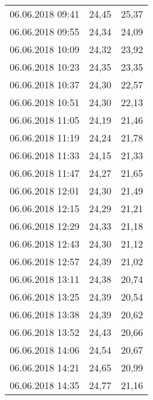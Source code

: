 \documentclass[a4paper,11pt,twoside]{article}
\begin{document}
\begin{longtable}[c]{ccc}
06.06.2018 09:41       & 24,45                & 25,37                          \\
06.06.2018 09:55       & 24,34                & 24,09                          \\
06.06.2018 10:09       & 24,32                & 23,92                          \\
06.06.2018 10:23       & 24,35                & 23,35                          \\
06.06.2018 10:37       & 24,30                & 22,57                          \\
06.06.2018 10:51       & 24,30                & 22,13                          \\
06.06.2018 11:05       & 24,19                & 21,46                          \\
06.06.2018 11:19       & 24,24                & 21,78                          \\
06.06.2018 11:33       & 24,15                & 21,33                          \\
06.06.2018 11:47       & 24,27                & 21,65                          \\
06.06.2018 12:01       & 24,30                & 21,49                          \\
06.06.2018 12:15       & 24,29                & 21,21                          \\
06.06.2018 12:29       & 24,33                & 21,18                          \\
06.06.2018 12:43       & 24,30                & 21,12                          \\
06.06.2018 12:57       & 24,39                & 21,02                          \\
06.06.2018 13:11       & 24,38                & 20,74                          \\
06.06.2018 13:25       & 24,39                & 20,54                          \\
06.06.2018 13:38       & 24,39                & 20,62                          \\
06.06.2018 13:52       & 24,43                & 20,66                          \\
06.06.2018 14:06       & 24,54                & 20,67                          \\
06.06.2018 14:21       & 24,65                & 20,99                          \\
06.06.2018 14:35       & 24,77                & 21,16                          \\

\end{longtable}
\end{document}
